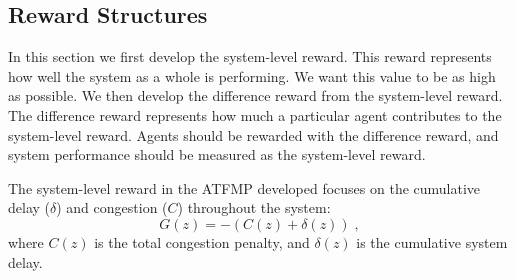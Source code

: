 \documentclass{aamas2014}
\begin{document}

 

\subsection{Reward Structures}

In this section we first develop the system-level reward. This reward represents how well the system as a whole is performing. We want this value to be as high as possible. We then develop the difference reward from the system-level reward. The difference reward represents how much a particular agent contributes to the system-level reward. Agents should be rewarded with the difference reward, and system performance should be measured as the system-level reward. 

The system-level reward in the ATFMP developed focuses on the cumulative delay ($\delta$) and congestion ($C$) throughout the system:
%
\begin{equation} \label{eq:Global}
G(z) = -(C(z) + \delta(z))\;,
\end{equation}
%
where $C(z)$ is the total congestion penalty, and $\delta(z)$ is the cumulative system delay.
\end{document}
